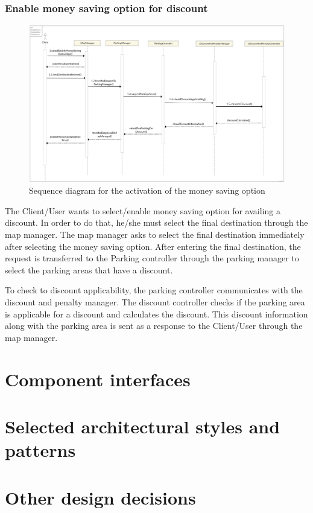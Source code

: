 \subsubsection{Enable money saving option for discount}
\begin{figure}[h]
	\centering
	\includegraphics[width=\linewidth,keepaspectratio]{figures/money_saving_option_runtime.eps}
	\caption{Sequence diagram for the activation of the money saving option}
	\label{fig:money_saving_option_runtime}
\end{figure}

The Client/User wants to select/enable money saving option for availing a discount. In order to do that, he/she must select the final destination through the map manager. The map manager asks to select the final destination immediately after selecting the money saving option. After entering the final destination, the request is transferred to the Parking controller through the parking manager to select the parking areas that have a discount.

To check to discount applicability, the parking controller communicates with the discount and penalty manager. The discount controller checks if the parking area is applicable for a discount and calculates the discount. This discount information along with the parking area is sent as a response to the Client/User through the map manager.


\section{Component interfaces}

\section{Selected architectural styles and patterns}

\section{Other design decisions}
